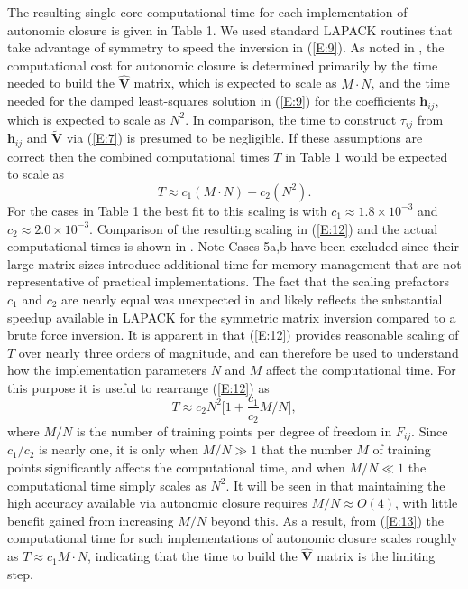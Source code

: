 The resulting single-core computational time for each implementation of autonomic closure is given in Table 1. We used standard LAPACK routines that take advantage of symmetry to speed the inversion in (\ref{E:9}). As noted in , the computational cost for autonomic closure is determined primarily by the time needed to build the $\widehat{\mathbf{V}}$  matrix, which is expected to scale as $M \cdot N$, and the time needed for the damped least-squares solution in (\ref{E:9}) for the coefficients $\mathbf{h}_{ij}$, which is expected to scale as $N^2$. In comparison, the time to construct  $\tau_{ij}$ from  $\mathbf{h}_{ij}$  and  $\widetilde{\mathbf{V}}$  via (\ref{E:7}) is presumed to be negligible. If these assumptions are correct then the combined computational times $T$ in Table 1 would be expected to scale as
%
\begin{equation}
	\label{E:12}
	T \approx c_1 (M \cdot N) + c_2 (N^2).
\end{equation}
%
%         
For the cases in Table 1 the best fit to this scaling is with $c_1 \approx 1.8 \times 10^{-3}$  and  $c_2 \approx 2.0 \times 10^{-3}$. Comparison of the resulting scaling in (\ref{E:12}) and the actual computational times is shown in . Note Cases 5a,b have been excluded since their large matrix sizes introduce additional time for memory management that are not representative of practical implementations. The fact that the scaling prefactors $c_1$  and  $c_2$ are nearly equal was unexpected in  and likely reflects the substantial speedup available in LAPACK for the symmetric matrix inversion compared to a brute force inversion.
It is apparent in  that (\ref{E:12}) provides reasonable scaling of $T$ over nearly three orders of magnitude, and can therefore be used to understand how the implementation parameters $N$ and $M$ affect the computational time. For this purpose it is useful to rearrange (\ref{E:12}) as
%
\begin{equation}
	\label{E:13}
	T \approx c_2 N^2 \bigg[ 1 + \frac{c_1}{c_2} M/N \bigg] ,
\end{equation}
%
%         
where  $M/N$ is the number of training points per degree of freedom in $F_{ij}$. Since $c_1/c_2$  is nearly one, it is only when $M/N \gg 1$  that the number $M$ of training points significantly affects the computational time, and when  $M/N \ll 1$ the computational time simply scales as $N^2$. It will be seen in  that maintaining the high accuracy available via autonomic closure requires $M/N \approx O(4)$, with little benefit gained from increasing $M/N$  beyond this. As a result, from (\ref{E:13}) the computational time for such implementations of autonomic closure scales roughly as $T \approx c_1 M \cdot N$, indicating that the time to build the $\widehat{\mathbf{V}}$ matrix is the limiting step.  

